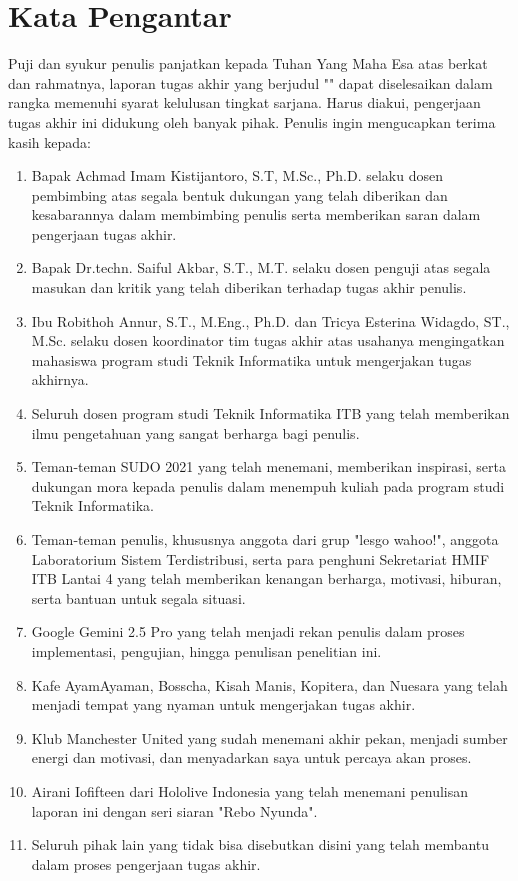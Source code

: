 \chapter*{Kata Pengantar}

Puji dan syukur penulis panjatkan kepada Tuhan Yang Maha Esa atas berkat dan rahmatnya, laporan tugas akhir yang berjudul "\thetitle" dapat diselesaikan dalam rangka memenuhi syarat kelulusan tingkat sarjana. Harus diakui, pengerjaan tugas akhir ini didukung oleh banyak pihak. Penulis ingin mengucapkan terima kasih kepada:

\begin{enumerate}
  \item Bapak Achmad Imam Kistijantoro, S.T, M.Sc., Ph.D. selaku dosen pembimbing atas segala bentuk dukungan yang telah diberikan dan kesabarannya dalam membimbing penulis serta memberikan saran dalam pengerjaan tugas akhir.
  \item Bapak Dr.techn. Saiful Akbar, S.T., M.T. selaku dosen penguji atas segala masukan dan kritik yang telah diberikan terhadap tugas akhir penulis.
  \item Ibu Robithoh Annur, S.T., M.Eng., Ph.D. dan Tricya Esterina Widagdo, ST., M.Sc. selaku dosen koordinator tim tugas akhir atas usahanya mengingatkan mahasiswa program studi Teknik Informatika untuk mengerjakan tugas akhirnya.
  \item Seluruh dosen program studi Teknik Informatika ITB yang telah memberikan ilmu pengetahuan yang sangat berharga bagi penulis.
  \item Teman-teman SUDO 2021 yang telah menemani, memberikan inspirasi, serta dukungan mora kepada penulis dalam menempuh kuliah pada program studi Teknik Informatika.
  \item Teman-teman penulis, khususnya anggota dari grup "lesgo wahoo!", anggota Laboratorium Sistem Terdistribusi, serta para penghuni Sekretariat HMIF ITB Lantai 4 yang telah memberikan kenangan berharga, motivasi, hiburan, serta bantuan untuk segala situasi.
  \item Google Gemini 2.5 Pro yang telah menjadi rekan penulis dalam proses implementasi, pengujian, hingga penulisan penelitian ini.
  \item Kafe AyamAyaman, Bosscha, Kisah Manis, Kopitera, dan Nuesara yang telah menjadi tempat yang nyaman untuk mengerjakan tugas akhir.
  \item Klub Manchester United yang sudah menemani akhir pekan, menjadi sumber energi dan motivasi, dan menyadarkan saya untuk percaya akan proses.
  \item Airani Iofifteen dari Hololive Indonesia yang telah menemani penulisan laporan ini dengan seri siaran "Rebo Nyunda".
  \item Seluruh pihak lain yang tidak bisa disebutkan disini yang telah membantu dalam proses pengerjaan tugas akhir.
\end{enumerate}

